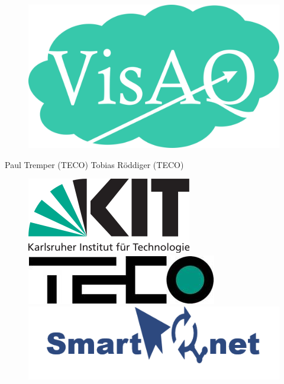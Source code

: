 \begin{titlepage}
    \maketitle
    \begin{tcolorbox}
        \centering
        {\Huge \textbf{\softwarename}}\\
        {\huge \longSoftwarename}\\
    \end{tcolorbox}
    \begin{figure}[h]
        \centering
        \includegraphics[scale=1] {media/logoHQ.png}
    \end{figure}
    \vspace{1cm}
    \centering
    Paul Tremper (TECO)
    \hspace{1cm}
    Tobias Röddiger (TECO)
    \begin{figure}[h]
        \centering
        \includegraphics[scale=0.27] {media/KIT_Logo.png}
        \hspace{3cm}
        \vspace{0.5cm}
        \includegraphics[scale=0.75] {media/teco.jpg}
        \includegraphics[scale=0.35]{media/SmartAQnet_logo.png}
    \end{figure}
\end{titlepage}

\tableofcontents